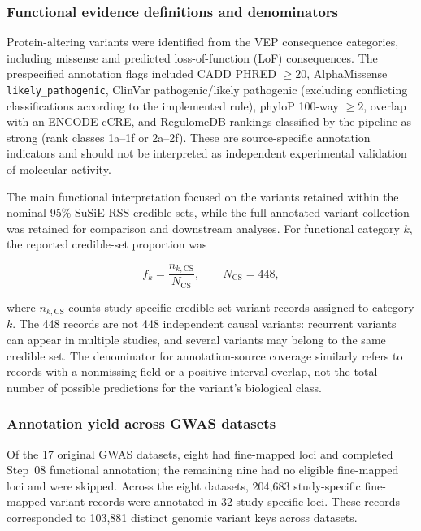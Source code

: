 \documentclass[11pt,a4paper]{article}
\begin{document}
\subsubsection{Functional evidence definitions and denominators}

Protein-altering variants were identified from the VEP
consequence categories, including missense and predicted
loss-of-function (LoF) consequences. The prespecified
annotation flags included CADD PHRED $\geq20$,
AlphaMissense \texttt{likely\_pathogenic}, ClinVar
pathogenic/likely pathogenic (excluding conflicting
classifications according to the implemented rule), phyloP
100-way $\geq2$, overlap with an ENCODE cCRE, and
RegulomeDB rankings classified by the pipeline as strong
(rank classes 1a--1f or 2a--2f).
These are source-specific annotation indicators and
should not be interpreted as independent experimental
validation of molecular activity.

The main functional interpretation focused on the variants
retained within the nominal 95\% SuSiE-RSS credible sets,
while the full annotated variant collection was retained
for comparison and downstream analyses. For functional
category $k$, the reported credible-set proportion was

\begin{equation}
 f_k = \frac{n_{k,\mathrm{CS}}}{N_{\mathrm{CS}}},
 \qquad N_{\mathrm{CS}}=448,
\end{equation}

where $n_{k,\mathrm{CS}}$ counts study-specific credible-set
variant records assigned to category $k$. The 448 records
are not 448 independent causal variants: recurrent variants
can appear in multiple studies, and several variants may
belong to the same credible set. The denominator for
annotation-source coverage similarly refers to records
with a nonmissing field or a positive interval overlap,
not the total number of possible predictions for the
variant's biological class.

\subsubsection{Annotation yield across GWAS datasets}

Of the 17 original GWAS datasets, eight had fine-mapped loci
and completed Step~08 functional annotation; the remaining
nine had no eligible fine-mapped loci and were skipped.
Across the eight datasets, 204,683 study-specific
fine-mapped variant records were annotated in 32
study-specific loci. These records corresponded to
103,881 distinct genomic variant keys across datasets.
\end{document}

